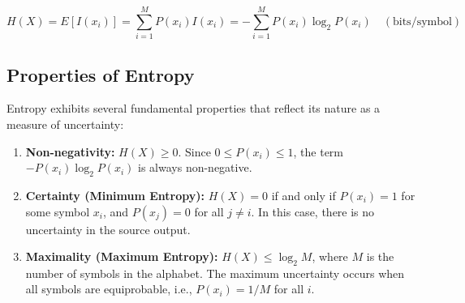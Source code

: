 \documentclass[12pt,a4paper]{article}
\begin{document}
\begin{tcolorbox}[formulabox, title={\textbf{Entropy Formula}}]
\begin{equation}
  H(X) = E[I(x_i)] = \sum_{i=1}^M P(x_i) I(x_i) = -\sum_{i=1}^M P(x_i) \log_2 P(x_i) \quad (\text{bits/symbol})
\end{equation}
\end{tcolorbox}

\subsection{Properties of Entropy}
Entropy exhibits several fundamental properties that reflect its nature as a measure of uncertainty:

\begin{enumerate}[label=\textbf{\arabic*.}, leftmargin=*, itemsep=4pt]
  \item \textbf{Non-negativity:} $H(X) \ge 0$. Since $0 \le P(x_i) \le 1$, the term $-P(x_i) \log_2 P(x_i)$ is always non-negative.
  \item \textbf{Certainty (Minimum Entropy):} $H(X) = 0$ if and only if $P(x_i) = 1$ for some symbol $x_i$, and $P(x_j) = 0$ for all $j \ne i$. In this case, there is no uncertainty in the source output.
  \item \textbf{Maximality (Maximum Entropy):} $H(X) \le \log_2 M$, where $M$ is the number of symbols in the alphabet. The maximum uncertainty occurs when all symbols are equiprobable, i.e., $P(x_i) = 1/M$ for all $i$.
\end{enumerate}
\end{document}
